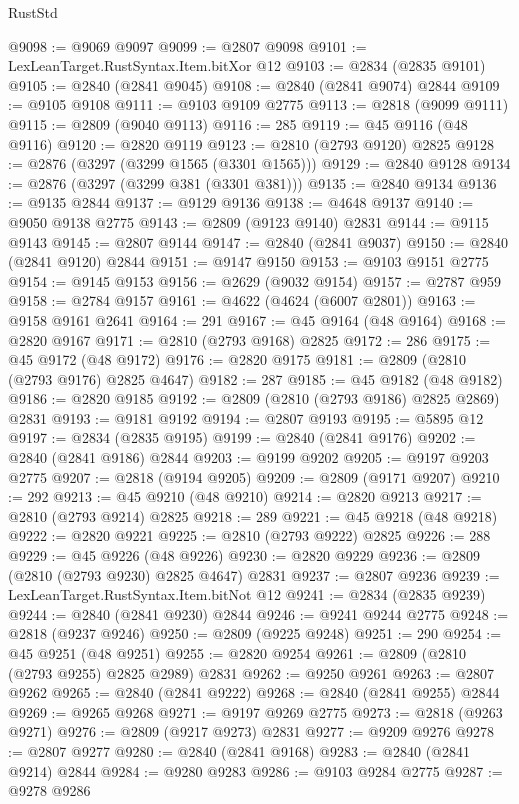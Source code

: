 \begin{lexlean}{RustStd}
\begin{coremodule}
@9098 := @9069 @9097
@9099 := @2807 @9098
@9101 := LexLeanTarget.RustSyntax.Item.bitXor @12
@9103 := @2834 (@2835 @9101)
@9105 := @2840 (@2841 @9045)
@9108 := @2840 (@2841 @9074) @2844
@9109 := @9105 @9108
@9111 := @9103 @9109 @2775
@9113 := @2818 (@9099 @9111)
@9115 := @2809 (@9040 @9113)
@9116 := 285
@9119 := @45 @9116 (@48 @9116)
@9120 := @2820 @9119
@9123 := @2810 (@2793 @9120) @2825
@9128 := @2876 (@3297 (@3299 @1565 (@3301 @1565)))
@9129 := @2840 @9128
@9134 := @2876 (@3297 (@3299 @381 (@3301 @381)))
@9135 := @2840 @9134
@9136 := @9135 @2844
@9137 := @9129 @9136
@9138 := @4648 @9137
@9140 := @9050 @9138 @2775
@9143 := @2809 (@9123 @9140) @2831
@9144 := @9115 @9143
@9145 := @2807 @9144
@9147 := @2840 (@2841 @9037)
@9150 := @2840 (@2841 @9120) @2844
@9151 := @9147 @9150
@9153 := @9103 @9151 @2775
@9154 := @9145 @9153
@9156 := @2629 (@9032 @9154)
@9157 := @2787 @959
@9158 := @2784 @9157
@9161 := @4622 (@4624 (@6007 @2801))
@9163 := @9158 @9161 @2641
@9164 := 291
@9167 := @45 @9164 (@48 @9164)
@9168 := @2820 @9167
@9171 := @2810 (@2793 @9168) @2825
@9172 := 286
@9175 := @45 @9172 (@48 @9172)
@9176 := @2820 @9175
@9181 := @2809 (@2810 (@2793 @9176) @2825 @4647)
@9182 := 287
@9185 := @45 @9182 (@48 @9182)
@9186 := @2820 @9185
@9192 := @2809 (@2810 (@2793 @9186) @2825 @2869) @2831
@9193 := @9181 @9192
@9194 := @2807 @9193
@9195 := @5895 @12
@9197 := @2834 (@2835 @9195)
@9199 := @2840 (@2841 @9176)
@9202 := @2840 (@2841 @9186) @2844
@9203 := @9199 @9202
@9205 := @9197 @9203 @2775
@9207 := @2818 (@9194 @9205)
@9209 := @2809 (@9171 @9207)
@9210 := 292
@9213 := @45 @9210 (@48 @9210)
@9214 := @2820 @9213
@9217 := @2810 (@2793 @9214) @2825
@9218 := 289
@9221 := @45 @9218 (@48 @9218)
@9222 := @2820 @9221
@9225 := @2810 (@2793 @9222) @2825
@9226 := 288
@9229 := @45 @9226 (@48 @9226)
@9230 := @2820 @9229
@9236 := @2809 (@2810 (@2793 @9230) @2825 @4647) @2831
@9237 := @2807 @9236
@9239 := LexLeanTarget.RustSyntax.Item.bitNot @12
@9241 := @2834 (@2835 @9239)
@9244 := @2840 (@2841 @9230) @2844
@9246 := @9241 @9244 @2775
@9248 := @2818 (@9237 @9246)
@9250 := @2809 (@9225 @9248)
@9251 := 290
@9254 := @45 @9251 (@48 @9251)
@9255 := @2820 @9254
@9261 := @2809 (@2810 (@2793 @9255) @2825 @2989) @2831
@9262 := @9250 @9261
@9263 := @2807 @9262
@9265 := @2840 (@2841 @9222)
@9268 := @2840 (@2841 @9255) @2844
@9269 := @9265 @9268
@9271 := @9197 @9269 @2775
@9273 := @2818 (@9263 @9271)
@9276 := @2809 (@9217 @9273) @2831
@9277 := @9209 @9276
@9278 := @2807 @9277
@9280 := @2840 (@2841 @9168)
@9283 := @2840 (@2841 @9214) @2844
@9284 := @9280 @9283
@9286 := @9103 @9284 @2775
@9287 := @9278 @9286

\end{coremodule}
\end{lexlean}
